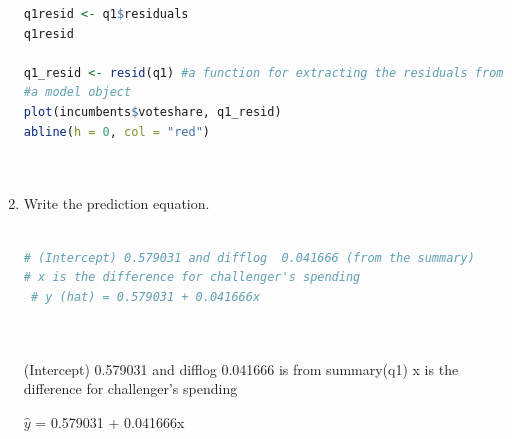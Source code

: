 \documentclass[12pt,letterpaper]{article}
\begin{document}
\begin{enumerate}
\begin{lstlisting}[language=R]
q1resid <- q1$residuals
q1resid 

q1_resid <- resid(q1) #a function for extracting the residuals from
#a model object
plot(incumbents$voteshare, q1_resid)
abline(h = 0, col = "red")
		
		
		\end{lstlisting}
		
		\item Write the prediction equation.
		
		\begin{lstlisting}[language=R]
		
# (Intercept) 0.579031 and difflog  0.041666 (from the summary)
# x is the difference for challenger's spending
 # y (hat) = 0.579031 + 0.041666x 
 
		
			\end{lstlisting}

(Intercept) 0.579031 and difflog  0.041666 is from summary(q1)
x is the difference for challenger's spending

$\hat{y}$	= 0.579031 + 0.041666x 	
		
	\end{enumerate}
	
\newpage
\end{document}
